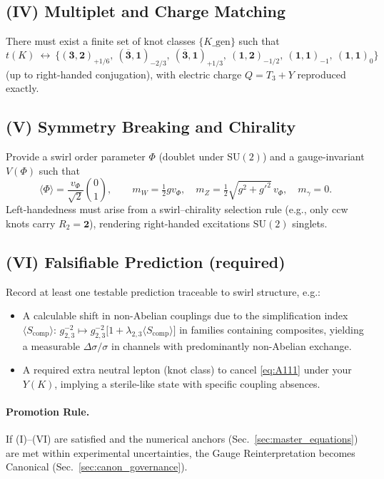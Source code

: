 \documentclass[11pt]{article}
\begin{document}
\subsection*{(IV) Multiplet and Charge Matching}
There must exist a finite set of knot classes $\{K\_\mathrm{gen}\}$ such that
\[
	t(K)\ \leftrightarrow\ \{(\mathbf 3,\mathbf 2)_{+1/6},\ (\overline{\mathbf 3},\mathbf 1)_{-2/3},\ (\overline{\mathbf 3},\mathbf 1)_{+1/3},\ (\mathbf 1,\mathbf 2)_{-1/2},\ (\mathbf 1,\mathbf 1)_{-1},\ (\mathbf 1,\mathbf 1)_{0}\}
\]
(up to right-handed conjugation), with electric charge $Q=T_3+Y$ reproduced exactly.

\subsection*{(V) Symmetry Breaking and Chirality}
Provide a swirl order parameter $\Phi$ (doublet under $\mathrm{SU}(2)$) and a gauge-invariant $V(\Phi)$ such that
\[
	\langle\Phi\rangle = \frac{v_\Phi}{\sqrt 2}\binom{0}{1},\qquad
	m_W=\tfrac12 g v_\Phi,\quad m_Z=\tfrac12\sqrt{g^2+g'^2}\,v_\Phi,\quad m_\gamma=0.
\]
Left-handedness must arise from a swirl–chirality selection rule (e.g., only ccw knots carry $R_2=\mathbf 2$), rendering right-handed excitations $\mathrm{SU}(2)$ singlets.

\subsection*{(VI) Falsifiable Prediction (required)}
Record at least one testable prediction traceable to swirl structure, e.g.:
\begin{itemize}
	\item A calculable shift in non-Abelian couplings due to the simplification index $\langle S_{\mathrm{comp}}\rangle$:
	$g_{2,3}^{-2}\mapsto g_{2,3}^{-2}\big[1+\lambda_{2,3}\langle S_{\mathrm{comp}}\rangle\big]$
	in families containing composites, yielding a measurable $\Delta\sigma/\sigma$ in channels with predominantly non-Abelian exchange.
	\item A required extra neutral lepton (knot class) to cancel \eqref{eq:A111} under your $Y(K)$, implying a sterile-like state with specific coupling absences.
\end{itemize}

\paragraph{Promotion Rule.}
If (I)–(VI) are satisfied and the numerical anchors (Sec.~\ref{sec:master_equations}) are met within experimental uncertainties, the Gauge Reinterpretation becomes Canonical (Sec.~\ref{sec:canon_governance}).
\end{document}
